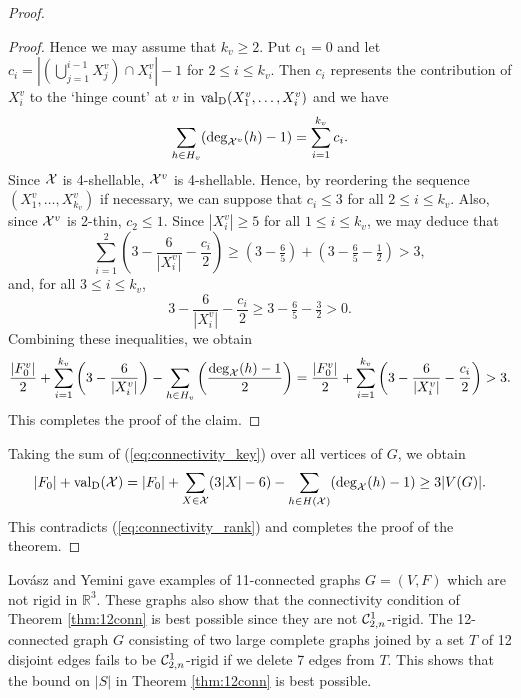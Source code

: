\documentclass{daj}
\newcommand{\R}{\mathbb{R}}
\newcommand{\valD}{{\rm val}_{\rm D}}
\begin{document}
\begin{proof}
\begin{proof}
Hence we may assume that $k_v\geq 2$.
Put $c_1=0$ and let $c_i=\left|\left(\bigcup_{j=1}^{i-1}X_j^v\right)\cap X_i^v\right|-1$ for $2\leq i \leq k_v$. 
Then $c_i$ represents the contribution of $X_i^v$ to the `hinge count' at $v$ in
$\valD(X_1^v, \dots, X_{i}^v)$
and we have
\[
\sum_{h\in H_v}({\rm deg}_{{\cal X}^v}(h)-1)=\sum_{i=1}^{k_v}c_i.
\]
Since ${\cal X}$ is 4-shellable, ${\cal X}^v$ is 4-shellable.
Hence, by reordering the sequence $(X_1^v,\dots, X_{k_v}^v)$ if necessary, we can suppose that $c_i\leq 3$ for all $2\leq i\leq k_v$. 
Also, since ${\cal X}^v$ is 2-thin, 
$c_2\leq 1$.
Since $|X_i^v|\geq 5$ for all $1\leq i\leq k_v$, we may deduce that
\[
\sum_{i=1}^2 \left(3-\frac{6}{|X_i^v|}-\frac{c_i}{2}\right)\geq 
(3-\tfrac{6}{5})+(3-\tfrac{6}{5}-\tfrac{1}{2})>3,
\]
and, for all $3\leq i\leq k_v$,
\[
3-\frac{6}{|X_i^v|}-\frac{c_i}{2}\geq 3-\tfrac{6}{5}-\tfrac{3}{2}> 0.
\]
Combining these inequalities, we obtain
$$
\frac{|F_0^v|}{2}+\sum_{i=1}^{k_v}\left(3-\frac{6}{|X_i^v|}\right)-\sum_{h\in H_v}\left(\frac{{\rm deg}_{\cal X}(h)-1}{2}\right)
= \frac{|F_0^v|}{2}+\sum_{i=1}^{k_v}\left(3-\frac{6}{|X_i^v|}-\frac{c_i}{2}\right)>3. 
$$
This completes the proof of the claim.
\end{proof}

Taking the sum of (\ref{eq:connectivity_key}) over all vertices of $G$, we obtain
\[
|F_0|+\valD({\cal X})=|F_0|+\sum_{X\in {\cal X}}(3|X|-6)-\sum_{h\in H({\cal X})} ({\rm deg}_{\cal X}(h)-1)\geq 3|V(G)|.
\]
This contradicts (\ref{eq:connectivity_rank}) and completes the proof of the theorem. 
%
\end{proof}

Lov\'asz and Yemini  \cite{LY82} gave examples of 11-connected graphs $G=(V,F)$  which are not rigid in $\R^3$.  These graphs also show that the connectivity condition of Theorem \ref{thm:12conn} is best possible since they are not ${\cal C}_{2,n}^1$-rigid. The 12-connected graph $G$ consisting of two large complete graphs joined by a set $T$ of 12 disjoint edges fails to be  ${\cal C}_{2,n}^1$-rigid if we delete 7 edges from $T$. This shows that the bound on $|S|$ in Theorem \ref{thm:12conn} is best possible.
\end{document}

